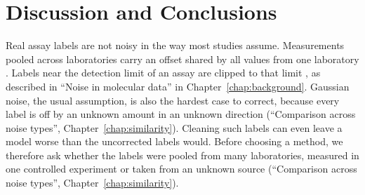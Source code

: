 \chapter{Discussion and Conclusions}\label{chap:discussion}

Real assay labels are not noisy in the way most studies assume. Measurements pooled across laboratories carry an offset shared by all values from one laboratory \citep{Bentz2013}. Labels near the detection limit of an assay are clipped to that limit \citep{Svensson2025}, as described in ``Noise in molecular data'' in Chapter~\ref{chap:background}. Gaussian noise, the usual assumption, is also the hardest case to correct, because every label is off by an unknown amount in an unknown direction (``Comparison across noise types'', Chapter~\ref{chap:similarity}). Cleaning such labels can even leave a model worse than the uncorrected labels would. Before choosing a method, we therefore ask whether the labels were pooled from many laboratories, measured in one controlled experiment or taken from an unknown source (``Comparison across noise types'', Chapter~\ref{chap:similarity}).

